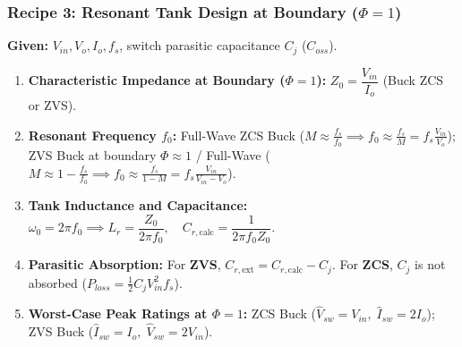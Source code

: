 \subsubsection*{Recipe 3: Resonant Tank Design at Boundary ($\Phi = 1$)}
\vspace{-4pt}
\textbf{Given:} $V_{in}, V_o, I_o, f_s$, switch parasitic capacitance $C_j$ ($C_{oss}$).
\begin{enumerate}\setlength{\itemsep}{1pt}\setlength{\parskip}{0pt}
  \item \textbf{Characteristic Impedance at Boundary ($\Phi = 1$):} $Z_0 = \dfrac{V_{in}}{I_o}$ (Buck ZCS or ZVS).
  \item \textbf{Resonant Frequency $f_0$:}
  Full-Wave ZCS Buck ($M \approx \frac{f_s}{f_0} \implies f_0 \approx \frac{f_s}{M} = f_s \frac{V_{in}}{V_o}$);
  ZVS Buck at boundary $\Phi \approx 1$ / Full-Wave ($M \approx 1 - \frac{f_s}{f_0} \implies f_0 \approx \frac{f_s}{1-M} = f_s \frac{V_{in}}{V_{in}-V_o}$).
  \item \textbf{Tank Inductance and Capacitance:} $\omega_0 = 2\pi f_0 \implies L_r = \dfrac{Z_0}{2\pi f_0}, \quad C_{r,\mathrm{calc}} = \dfrac{1}{2\pi f_0 Z_0}$.
  \item \textbf{Parasitic Absorption:} For \textbf{ZVS}, $C_{r,\mathrm{ext}} = C_{r,\mathrm{calc}} - C_j$. For \textbf{ZCS}, $C_j$ is not absorbed ($P_{loss} = \frac{1}{2} C_j V_{in}^2 f_s$).
  \item \textbf{Worst-Case Peak Ratings at $\Phi = 1$:} ZCS Buck ($\hat{V}_{sw} = V_{in}, \; \hat{I}_{sw} = 2 I_o$); ZVS Buck ($\hat{I}_{sw} = I_o, \; \hat{V}_{sw} = 2 V_{in}$).
\end{enumerate}
